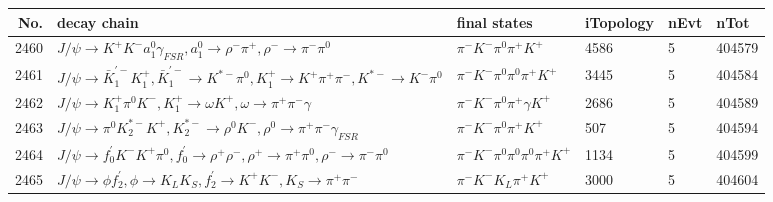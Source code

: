 \begin{table}[htbp] 
\begin{center}
\begin{small}
\begin{tabular}{rlllll}\hline\hline
 No. & decay chain & final states &  iTopology & nEvt & nTot \\\hline
2460&$J/\psi       \rightarrow K^{+}          K^{-}          a_{1}^{0}      \gamma_{FSR} , a_{1}^{0}       \rightarrow \rho^{-}      \pi^{+}        , \rho^{-}       \rightarrow \pi^{-}        \pi^{0}        $&$\pi^{-}        K^{-}          \pi^{0}        \pi^{+}        K^{+}          $& 4586&    5&404579\\
2461&$J/\psi       \rightarrow \bar{K}_1^{'-}K_1^{+}        , \bar{K}_1^{'-} \rightarrow K^{*-}         \pi^{0}        , K_1^{+}         \rightarrow K^{+}          \pi^{+}        \pi^{-}        , K^{*-}          \rightarrow K^{-}          \pi^{0}        $&$\pi^{-}        K^{-}          \pi^{0}        \pi^{0}        \pi^{+}        K^{+}          $& 3445&    5&404584\\
2462&$J/\psi       \rightarrow K_1^{+}        \pi^{0}        K^{-}          , K_1^{+}         \rightarrow \omega         K^{+}          , \omega          \rightarrow \pi^{+}        \pi^{-}        \gamma       $&$\pi^{-}        K^{-}          \pi^{0}        \pi^{+}        \gamma       K^{+}          $& 2686&    5&404589\\
2463&$J/\psi       \rightarrow \pi^{0}        K_2^{*-}       K^{+}          , K_2^{*-}        \rightarrow \rho^{0}      K^{-}          , \rho^{0}       \rightarrow \pi^{+}        \pi^{-}        \gamma_{FSR} $&$\pi^{-}        K^{-}          \pi^{0}        \pi^{+}        K^{+}          $&  507&    5&404594\\
2464&$J/\psi       \rightarrow f^{'}_{0}     K^{-}          K^{+}          \pi^{0}        , f^{'}_{0}      \rightarrow \rho^{+}      \rho^{-}      , \rho^{+}       \rightarrow \pi^{+}        \pi^{0}        , \rho^{-}       \rightarrow \pi^{-}        \pi^{0}        $&$\pi^{-}        K^{-}          \pi^{0}        \pi^{0}        \pi^{0}        \pi^{+}        K^{+}          $& 1134&    5&404599\\
2465&$J/\psi       \rightarrow \phi           f_2^{'}       , \phi            \rightarrow K_{L}          K_{S}          , f_2^{'}        \rightarrow K^{+}          K^{-}          , K_{S}           \rightarrow \pi^{+}        \pi^{-}        $&$\pi^{-}        K^{-}          K_{L}          \pi^{+}        K^{+}          $& 3000&    5&404604\\

\end{tabular}
\end{small}
\end{center}
\end{table}
